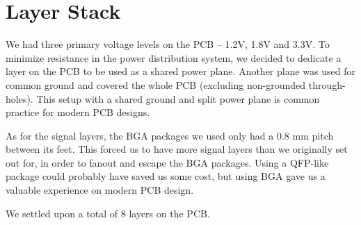 \section{Layer Stack}

We had three primary voltage levels on the PCB -- 1.2V, 1.8V and 3.3V. To
minimize resistance in the power distribution system, we decided to dedicate a
layer on the PCB to be used as a shared power plane. Another plane was used for
common ground and covered the whole PCB (excluding non-grounded through-holes).
This setup with a shared ground and split power plane is common practice for
modern PCB designs.

As for the signal layers, the BGA packages we used only had a 0.8 mm pitch between
its feet. This forced us to have more signal layers than we originally set out
for, in order to fanout and escape the BGA packages. Using a QFP-like package
could probably have saved us some cost, but using BGA gave us a valuable
experience on modern PCB design.

We settled upon a total of 8 layers on the PCB.
